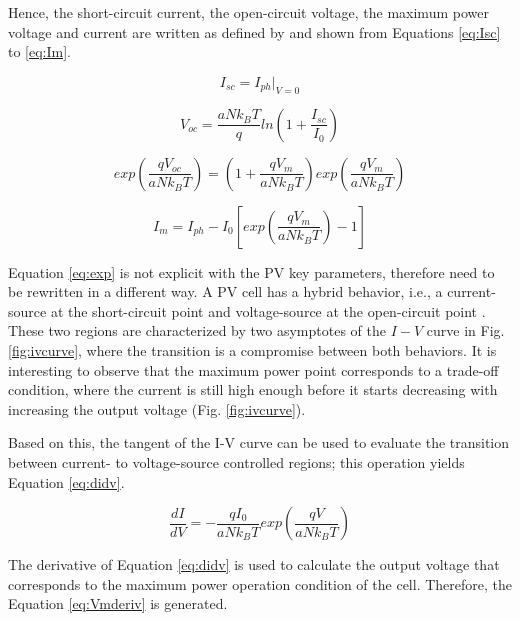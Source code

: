 Hence, the short-circuit current, the open-circuit voltage, the maximum power voltage and current are written as defined by \cite{Saloux} and shown from Equations \ref{eq:Isc} to \ref{eq:Im}.

\begin{equation}
\label{eq:Isc}
I_{sc}=I_{ph}\vert_{V=0}
\end{equation}

\begin{equation}
\label{eq:Voc}
V_{oc}=\dfrac{aNk_{B}T}{q}ln\left( 1+\dfrac{I_{sc}}{I_{0}} \right) 
\end{equation}

\begin{equation}
\label{eq:exp}
exp\left( \dfrac{qV_{oc}}{aNk_{B}T} \right) = \left(1+\dfrac{qV_{m}}{aNk_{B}T} \right) exp \left( \dfrac{qV_{m}}{aNk_{B}T} \right) 
\end{equation}

\begin{equation}
\label{eq:Im}
I_{m} =I_{ph}-I_{0}\left[ exp \left( \dfrac{qV_{m}}{aNk_{B}T} \right) -1 \right] 
\end{equation}

Equation \ref{eq:exp} is not explicit with the PV key parameters, therefore need to be rewritten in a different way. A PV cell has a hybrid behavior, i.e., a current-source at the short-circuit point and voltage-source at the open-circuit point \cite{Saloux}. These two regions are characterized by two asymptotes of the $ I-V $ curve in Fig. \ref{fig:ivcurve}, where the transition is a compromise between both behaviors. It is interesting to observe that the maximum power point corresponds to a trade-off condition, where the current is still high enough before it starts decreasing with increasing the output voltage (Fig. \ref{fig:ivcurve}).

Based on this, the tangent of the I-V curve can be used to evaluate the transition between current- to voltage-source controlled regions; this operation yields Equation \ref{eq:didv}.

\begin{equation}
\label{eq:didv}
\dfrac{dI}{dV}=-\dfrac{qI_{0}}{aNk_{B}T}exp \left( \dfrac{qV}{aNk_{B}T}  \right) 
\end{equation}

The derivative of Equation \ref{eq:didv} is used to calculate the output voltage that corresponds to the maximum power operation condition of the cell. Therefore, the Equation \ref{eq:Vmderiv} is generated.

